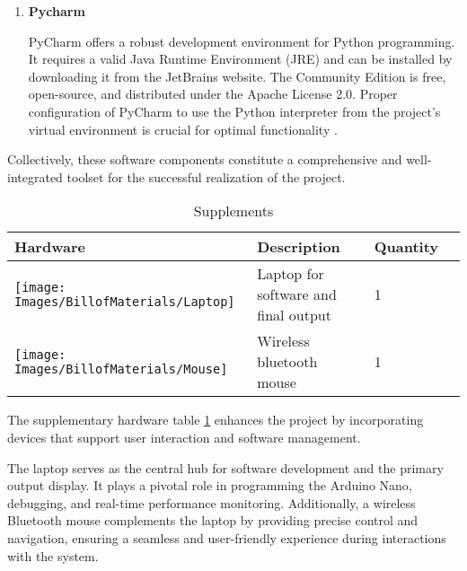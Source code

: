 \begin{enumerate}
\begin{itemize}
		\item \textbf{Pandas 1.3.2:}
		\begin{itemize}
			\item Pandas is a powerful data manipulation and analysis library. It provides data structures like DataFrames that are useful for handling structured data. In your project, Pandas might be used for organizing and preprocessing data before training machine learning models.
		\end{itemize}
	\end{itemize}
	
	\item \textbf{Pycharm}
	
	PyCharm offers a robust development environment for Python programming. It requires a valid Java Runtime Environment (JRE) and can be installed by downloading it from the JetBrains website. The Community Edition is free, open-source, and distributed under the Apache License 2.0. Proper configuration of PyCharm to use the Python interpreter from the project's virtual environment is crucial for optimal functionality \cite{JetBrains:2023}.
	
\end{enumerate}

Collectively, these software components constitute a comprehensive and well-integrated toolset for the successful realization of the project.

\begin{table}[H]
	
	\begin{tabular}{||m{4cm}|m{6.0cm}|m{2cm}|m||}
		
		\hline
		
		\textbf{Hardware} & \textbf{Description} & \textbf{Quantity} \\
		
		\hline
		
		\texttt{[image: Images/BillofMaterials/Laptop]} & Laptop for software and final output & 1 \\
		
		\hline
		
		\texttt{[image: Images/BillofMaterials/Mouse]} & Wireless bluetooth mouse & 1 \\
		
		\hline
		
	\end{tabular}
	
	\caption {Supplements}
	\label{Table 5.3}
\end{table}

The supplementary hardware table \ref{Table 5.3} enhances the project by incorporating devices that support user interaction and software management.  

The laptop serves as the central hub for software development and the primary output display. It plays a pivotal role in programming the Arduino Nano, debugging, and real-time performance monitoring. Additionally, a wireless Bluetooth mouse complements the laptop by providing precise control and navigation, ensuring a seamless and user-friendly experience during interactions with the system.



